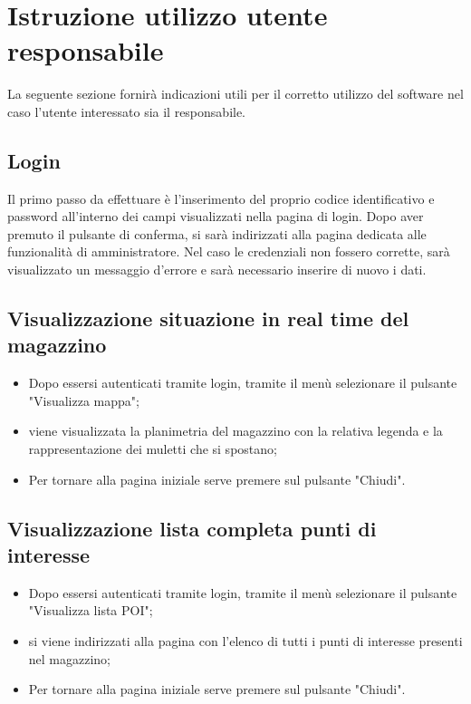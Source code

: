 \section{Istruzione utilizzo utente responsabile}

La seguente sezione fornirà indicazioni utili per il corretto utilizzo del software nel caso l'utente interessato sia il responsabile.

\subsection{Login}
Il primo passo da effettuare è l'inserimento del proprio codice identificativo e password all'interno dei campi visualizzati nella pagina di login. Dopo aver premuto il pulsante di conferma, si sarà indirizzati alla pagina dedicata alle funzionalità di amministratore. Nel caso le credenziali non fossero corrette, sarà visualizzato un messaggio d'errore e sarà necessario inserire di nuovo i dati.

\subsection{Visualizzazione situazione in real time del magazzino}
\begin{itemize}
    \item Dopo essersi autenticati tramite login, tramite il menù selezionare il pulsante "Visualizza mappa";
    \item viene visualizzata la planimetria del magazzino con la relativa legenda e la rappresentazione dei muletti che si spostano;
    \item Per tornare alla pagina iniziale serve premere sul pulsante "Chiudi".
\end{itemize}
\subsection{Visualizzazione lista completa punti di interesse}
\begin{itemize}
    \item Dopo essersi autenticati tramite login, tramite il menù selezionare il pulsante "Visualizza lista POI";
    \item si viene indirizzati alla pagina con l'elenco di tutti i punti di interesse presenti nel magazzino;
    \item Per tornare alla pagina iniziale serve premere sul pulsante "Chiudi".
\end{itemize}

